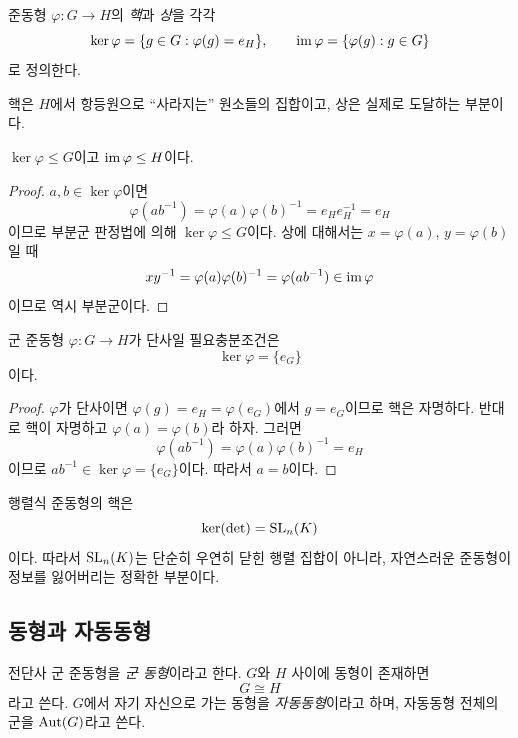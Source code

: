 \begin{definition}[핵과 상]
준동형 $\varphi:G\to H$의 \emph{핵}과 \emph{상}을 각각
\[
  \ker\varphi=\{g\in G:\varphi(g)=e_H\},
  \qquad
  \operatorname{im}\varphi=\{\varphi(g):g\in G\}
\]
로 정의한다.
\end{definition}

핵은 $H$에서 항등원으로 ``사라지는'' 원소들의 집합이고, 상은 실제로 도달하는 부분이다.

\begin{proposition}
$\ker\varphi\le G$이고 $\operatorname{im}\varphi\le H$이다.
\end{proposition}

\begin{proof}
$a,b\in\ker\varphi$이면
\[
 \varphi(ab^{-1})=\varphi(a)\varphi(b)^{-1}=e_He_H^{-1}=e_H
\]
이므로 부분군 판정법에 의해 $\ker\varphi\le G$이다. 상에 대해서는 $x=\varphi(a)$, $y=\varphi(b)$일 때
\[
  xy^{-1}=\varphi(a)\varphi(b)^{-1}=\varphi(ab^{-1})\in\operatorname{im}\varphi
\]
이므로 역시 부분군이다.
\end{proof}

\begin{proposition}[단사성과 핵]
군 준동형 $\varphi:G\to H$가 단사일 필요충분조건은
\[
  \ker\varphi=\{e_G\}
\]
이다.
\end{proposition}

\begin{proof}
$\varphi$가 단사이면 $\varphi(g)=e_H=\varphi(e_G)$에서 $g=e_G$이므로 핵은 자명하다. 반대로 핵이 자명하고 $\varphi(a)=\varphi(b)$라 하자. 그러면
\[
  \varphi(ab^{-1})=\varphi(a)\varphi(b)^{-1}=e_H
\]
이므로 $ab^{-1}\in\ker\varphi=\{e_G\}$이다. 따라서 $a=b$이다.
\end{proof}

\begin{example}
행렬식 준동형의 핵은
\[
  \ker(\det)=\operatorname{SL}_n(K)
\]
이다. 따라서 $\operatorname{SL}_n(K)$는 단순히 우연히 닫힌 행렬 집합이 아니라, 자연스러운 준동형이 정보를 잃어버리는 정확한 부분이다.
\end{example}

\subsection{동형과 자동동형}

\begin{definition}
전단사 군 준동형을 \emph{군 동형}이라고 한다. $G$와 $H$ 사이에 동형이 존재하면
\[
  G\cong H
\]
라고 쓴다. $G$에서 자기 자신으로 가는 동형을 \emph{자동동형}이라고 하며, 자동동형 전체의 군을 $\operatorname{Aut}(G)$라고 쓴다.
\end{definition}

